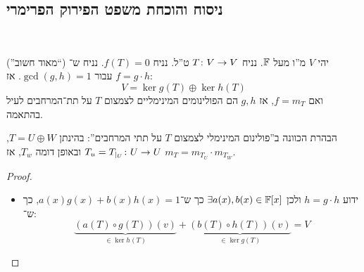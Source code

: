 \documentclass[name=רשימות אלגברה לינארית 2א]{../../../tex/classes/megasumPreamble}
\begin{document}
	\subsection{ניסוח והוכחת משפט הפירוק הפרימרי}\ 
	\begin{Theorem}
		(''מאוד חשוב``) יהי $V$ מ''ו מעל $\mathbb{F}$. נניח $T \colon V \to V$ ט''ל. נניח $f(T) = 0$. נניח ש־$f = g \cdot h$ עבור $\gcd(g, h) = 1$. אז: 
		\[ V = \ker g(T) \oplus \ker h(T) \]
		ואם $f = m_T$, אז $g, h$ הם הפולינומים המינימליים לצמצום $T$ על תת־המרחבים לעיל בהתאמה. 
	\end{Theorem}
	הבהרת הכוונה ב''פולינום המינימלי לצמצום $T$ על תתי המרחבים'': בהינתן $T = U \oplus W$, $T_u = T_{\mid_U} \colon U \to U$ ובאופן דומה $T_w$, אז $m_T = m_{T_U} \cdot m_{T_W}$. 
	\begin{proof}\,
		\begin{itemize}
			\item ידוע $h= g \cdot h$ ולכן $\exists a(x), b(x) \in \mathbb{F}[x]$ כך ש־$a(x)g(x) + b(x)h(x) = 1$, כך ש־: 
			\[ \underbrace{(a(T) \circ g(T))(v)}_{\in \ker h(T)} + \underbrace{(b(T) \circ h(T))(v)}_{\in \ker g(T)} = V \]
			

\end{itemize}
\end{proof}
\end{document}
